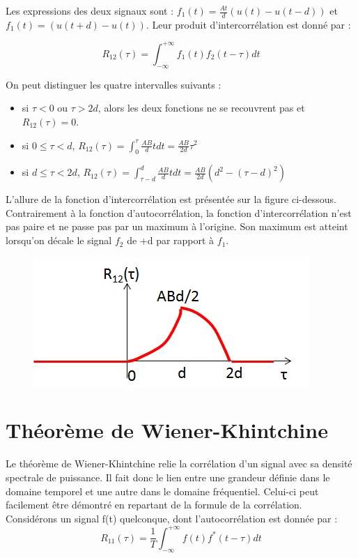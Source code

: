 	Les expressions des deux signaux sont : $f_{1}(t)=\frac{At}{d}(u(t)-u(t-d))$ et $f_{1}(t)=(u(t+d)-u(t))$. Leur produit d'intercorrélation est donné par :
	
	\begin{equation*}
	R_{12}(\tau)=\int_{-\infty}^{+\infty}f_{1}(t)f_{2}(t-\tau)dt
	\end{equation*}
	
	On peut distinguer les quatre intervalles suivants :
	\begin{itemize}
		\item si $\tau < 0$ ou $\tau > 2d$, alors les deux fonctions ne se recouvrent pas et $R_{12}(\tau)=0$.
		\item si $0 \leq \tau < d$, $R_{12}(\tau)=\int_{0}^{\tau}\frac{AB}{d}tdt=\frac{AB}{2d}\tau ^{2}$ 
		\item si $d \leq \tau < 2d$, $R_{12}(\tau)=\int_{\tau-d}^{d}\frac{AB}{d}tdt=\frac{AB}{2d}(d^{2}-(\tau-d)^{2})$
	\end{itemize}
	
	L'allure de la fonction d'intercorrélation est présentée sur la figure ci-dessous. Contrairement à la fonction d'autocorrélation, la fonction d'intercorrélation n'est pas paire et ne passe pas par un maximum à l'origine. Son maximum est atteint lorsqu'on décale le signal $f_{2}$ de +d par rapport à $f_{1}$.


	\begin{figure}[h!]
		\centering
		\includegraphics[scale=0.6]{images/Ex_intercorrelation2.jpg}
	\end{figure}
	
	
	\vspace{1\baselineskip}
	
	
	\section{Théorème de Wiener-Khintchine}
	
	Le théorème de Wiener-Khintchine relie la corrélation d'un signal avec sa densité spectrale de puissance. Il fait donc le lien entre une grandeur définie dans le domaine temporel et une autre dans le domaine fréquentiel. Celui-ci peut facilement être démontré en repartant de la formule de la corrélation. Considérons un signal f(t) quelconque, dont l'autocorrélation est donnée par :
	\begin{equation*}
	R_{11}(\tau)=\frac{1}{T}\int_{-\infty}^{+\infty}f(t)f^{*}(t-\tau)dt
	\end{equation*}
	
